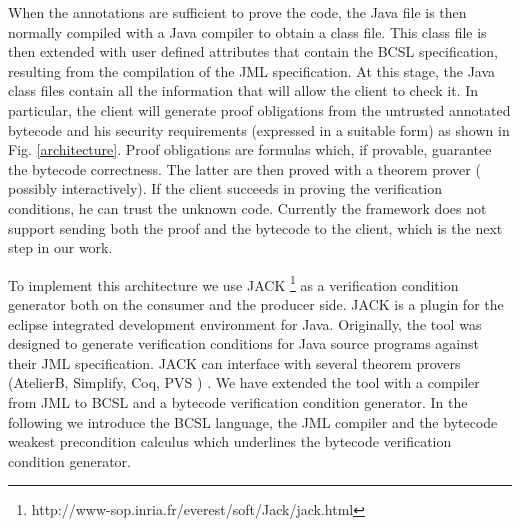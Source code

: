 When the annotations are sufficient to prove the code, 
the Java file is then normally compiled with a Java compiler to obtain a 
class file. This class file is then extended with user defined attributes that contain the BCSL specification, resulting from the compilation of the JML specification. 
At this stage, the Java class files contain all the information that will allow the client to check it. 
In particular, the client will generate proof obligations from the untrusted annotated bytecode and his security requirements 
(expressed in a suitable form) as shown in Fig. \ref{architecture}. Proof obligations are formulas which, if provable, guarantee the bytecode correctness.
The latter are then proved with a theorem prover ( possibly interactively). If the client succeeds in proving 
the verification conditions, he can trust the unknown code. Currently the framework does not support sending both the proof and the 
bytecode to the client, which is the next step in our work.


To implement this architecture we use JACK \footnote{ http://www-sop.inria.fr/everest/soft/Jack/jack.html} as a verification condition generator both on the consumer and the
producer side. JACK is a plugin for the eclipse  integrated development environment for Java. Originally, the tool was designed to generate verification conditions for Java source programs against their JML specification. JACK can interface with several theorem provers (AtelierB, Simplify, Coq, PVS ) . We have extended the tool with a compiler from JML to BCSL and a bytecode verification condition generator. In the following we introduce the BCSL language, the JML compiler and the bytecode weakest precondition calculus which underlines the bytecode verification condition generator.
 
